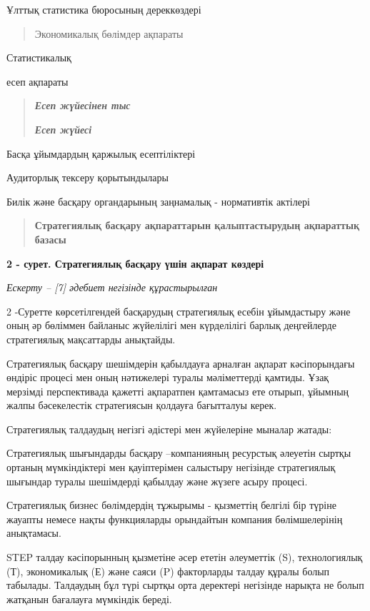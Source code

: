 Ұлттық статистика бюросының дереккөздері

\begin{quote}
Экономикалық бөлімдер ақпараты
\end{quote}

Статистикалық

есеп ақпараты

\begin{quote}
\emph{{\bfseries Есеп жүйесінен тыс}}

\emph{{\bfseries Есеп жүйесі}}
\end{quote}

Басқа ұйымдардың қаржылық есептіліктері

Аудиторлық тексеру қорытындылары

Билік және басқару органдарының заңнамалық - нормативтік актілері

\begin{quote}
{\bfseries Стратегиялық басқару ақпараттарын қалыптастырудың ақпараттық
базасы}
\end{quote}

{\bfseries 2 - сурет. Стратегиялық басқару үшін ақпарат көздері}

\emph{Ескерту -- {[}7{]} әдебиет негізінде құрастырылған}

2 -Суретте көрсетілгендей басқарудың стратегиялық есебін ұйымдастыру
және оның әр бөліммен байланыс жүйелілігі мен күрделілігі барлық
деңгейлерде стратегиялық мақсаттарды анықтайды.

Стратегиялық басқару шешімдерін қабылдауға арналған ақпарат
кәсіпорындағы өндіріс процесі мен оның нәтижелері туралы мәліметтерді
қамтиды. Ұзақ мерзімді перспективада қажетті ақпаратпен қамтамасыз ете
отырып, ұйымның жалпы бәсекелестік стратегиясын қолдауға бағытталуы
керек.

Стратегиялық талдаудың негізгі әдістері мен жүйелеріне мыналар жатады:

Стратегиялық шығындарды басқару --компанияның ресурстық әлеуетін сыртқы
ортаның мүмкіндіктері мен қауіптерімен салыстыру негізінде стратегиялық
шығындар туралы шешімдерді қабылдау және жүзеге асыру процесі.

Стратегиялық бизнес бөлімдердің тұжырымы - қызметтің белгілі бір түріне
жауапты немесе нақты функцияларды орындайтын компания бөлімшелерінің
анықтамасы.

STEP талдау кәсіпорынның қызметіне әсер ететін әлеуметтік (S),
технологиялық (Т), экономикалық (Е) және саяси (P) факторларды талдау
құралы болып табылады. Талдаудың бұл түрі сыртқы орта деректері
негізінде нарықта не болып жатқанын бағалауға мүмкіндік береді.

